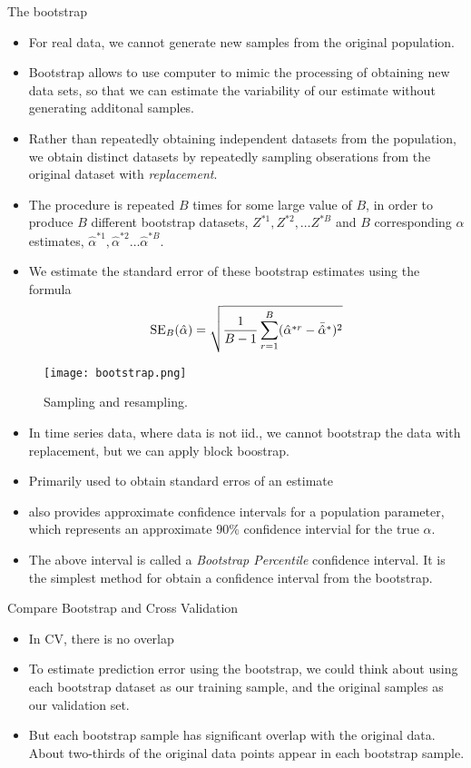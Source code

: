 \documentclass[11pt, a4paper]{article}
\begin{document}
The bootstrap
\begin{itemize}
  \item For real data, we cannot generate new samples from the original population.
  \item Bootstrap allows to use computer to mimic the processing of obtaining new data sets, so that we can estimate the variability of our estimate without generating additonal samples.
  \item Rather than repeatedly obtaining independent datasets from the population, we obtain distinct datasets by repeatedly sampling obserations from the original dataset with \emph{replacement}.
  \item The procedure is repeated $B$ times for some large value of $B$, in order to produce $B$ different bootstrap datasets, $Z^{*1},Z^{*2},\dots Z^{*B}$ and $B$ corresponding $\alpha$ estimates, $\hat{\alpha}^{*1},\hat{\alpha}^{*2}\dots \hat{\alpha}^{*B}$.
  \item We estimate the standard error of these bootstrap estimates using the formula
\[
  \operatorname{SE}_B(\hat{\alpha})=\sqrt{{1\over {B-1}}\sum_{r=1}^B(\hat{\alpha}^{*r}-\bar{\hat{\alpha}}^*)^2}
\]
\end{itemize}
\begin{figure}
[h!]
\centering
\texttt{[image: bootstrap.png]}
\caption{Sampling and resampling.}
\end{figure}
\begin{itemize}
  \item In time series data, where data is not iid., we cannot bootstrap the data with replacement, but we can apply block boostrap.
  \item Primarily used to obtain standard erros of an estimate
\item also provides approximate confidence intervals for a population parameter, which represents an approximate $90\%$ confidence intervial for the true $\alpha$.
\item The above interval is called a \emph{Bootstrap Percentile} confidence interval. It is the simplest method for obtain a confidence interval from the bootstrap.
\end{itemize}
Compare Bootstrap and Cross Validation
\begin{itemize}
\item In CV, there is no overlap
\item To estimate prediction error using the bootstrap, we could think about using each bootstrap dataset as our training sample, and the original samples as our validation set.
\item But each bootstrap sample has significant overlap with the original data. About two-thirds of the original data points appear in each bootstrap sample. 
\end{itemize}
\end{document}
